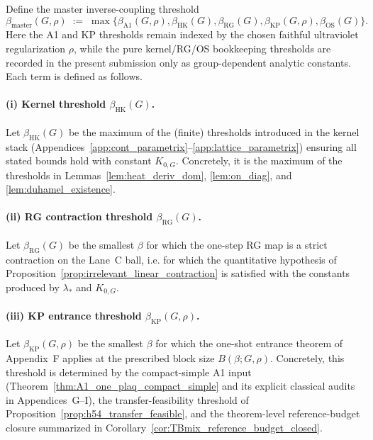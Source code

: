 Define the master inverse-coupling threshold
\begin{equation}
\label{eq:beta_master_threshold}
\beta_{\mathrm{master}}(G,\rho)
\;:=\;
\max\Big\{
\beta_{\mathrm{A1}}(G,\rho),
\beta_{\mathrm{HK}}(G),
\beta_{\mathrm{RG}}(G),
\beta_{\mathrm{KP}}(G,\rho),
\beta_{\mathrm{OS}}(G)
\Big\}.
\end{equation}
Here the A1 and KP thresholds remain indexed by the chosen faithful ultraviolet regularization $\rho$, while the pure kernel/RG/OS bookkeeping thresholds are recorded in the present submission only as group-dependent analytic constants.
Each term is defined as follows.

\paragraph{(i) Kernel threshold $\beta_{\mathrm{HK}}(G)$.}
Let $\beta_{\mathrm{HK}}(G)$ be the maximum of the (finite) thresholds introduced in the kernel stack
(Appendices~\ref{app:cont_parametrix}--\ref{app:lattice_parametrix}) ensuring all stated bounds hold with constant $K_{0,G}$.
Concretely, it is the maximum of the thresholds in Lemmas~\ref{lem:heat_deriv_dom}, \ref{lem:on_diag}, and \ref{lem:duhamel_existence}.

\paragraph{(ii) RG contraction threshold $\beta_{\mathrm{RG}}(G)$.}
Let $\beta_{\mathrm{RG}}(G)$ be the smallest $\beta$ for which the one-step RG map is a strict contraction on the Lane~C ball,
i.e. for which the quantitative hypothesis of Proposition~\ref{prop:irrelevant_linear_contraction} is satisfied with the
constants produced by $\lambda_\ast$ and $K_{0,G}$.

\paragraph{(iii) KP entrance threshold $\beta_{\mathrm{KP}}(G,\rho)$.}
Let $\beta_{\mathrm{KP}}(G,\rho)$ be the smallest $\beta$ for which the one-shot entrance theorem of Appendix~F applies at the prescribed block size $B(\beta;G,\rho)$.
Concretely, this threshold is determined by the compact-simple A1 input
(Theorem~\ref{thm:A1_one_plaq_compact_simple} and its explicit classical audits in Appendices~G--I),
the transfer-feasibility threshold of Proposition~\ref{prop:h54_transfer_feasible},
and the theorem-level reference-budget closure summarized in Corollary~\ref{cor:TBmix_reference_budget_closed}.

